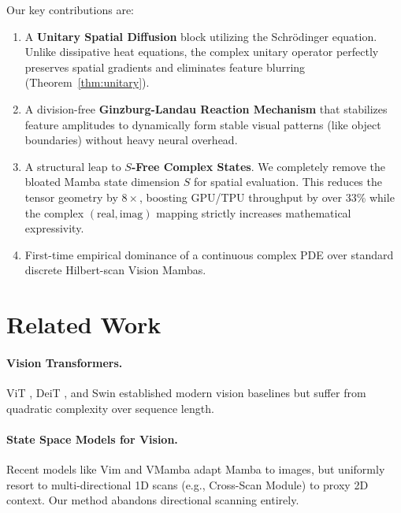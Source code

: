 \documentclass{article}
\begin{document}
Our key contributions are:
\begin{enumerate}
    \item A \textbf{Unitary Spatial Diffusion} block utilizing the Schrödinger
          equation. Unlike dissipative heat equations, the complex unitary operator perfectly
          preserves spatial gradients and eliminates feature blurring (Theorem~\ref{thm:unitary}).
    \item A division-free \textbf{Ginzburg-Landau Reaction Mechanism} that stabilizes feature
          amplitudes to dynamically form stable visual patterns (like object boundaries) 
          without heavy neural overhead.
    \item A structural leap to \textbf{$S$-Free Complex States}. We completely remove
          the bloated Mamba state dimension $S$ for spatial evaluation. This reduces the 
          tensor geometry by $8\times$, boosting GPU/TPU throughput by over 33\% while 
          the complex $(\text{real}, \text{imag})$ mapping strictly increases mathematical expressivity.
    \item First-time empirical dominance of a continuous complex PDE over standard 
          discrete Hilbert-scan Vision Mambas.
\end{enumerate}

\section{Related Work}

\paragraph{Vision Transformers.}
ViT \citep{dosovitskiy2020vit}, DeiT \citep{touvron2021deit}, and
Swin \citep{liu2021swin} established modern vision baselines but suffer from quadratic complexity over sequence length.

\paragraph{State Space Models for Vision.}
Recent models like Vim \citep{zhu2024vim} and VMamba \citep{liu2024vmamba} adapt Mamba to images, but uniformly resort to multi-directional 1D scans (e.g., Cross-Scan Module) to proxy 2D context. Our method abandons directional scanning entirely.
\end{document}
